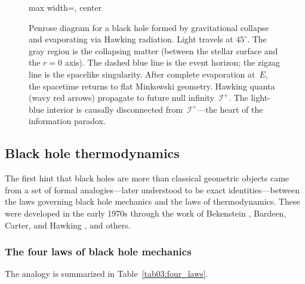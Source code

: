 \documentclass[11pt,letterpaper]{article}
\theoremstyle{plain}
\theoremstyle{definition}
\theoremstyle{remark}
\begin{document}
\begin{figure}[ht]
\begin{adjustbox}{max width=\textwidth, center}
\end{adjustbox}
\caption{Penrose diagram for a black hole formed by gravitational
collapse and evaporating via Hawking radiation.  Light travels at
$45^{\circ}$.  The gray region is the collapsing matter (between the
stellar surface and the $r\!=\!0$ axis).  The dashed blue line is the
event horizon; the zigzag line is the spacelike singularity.  After
complete evaporation at~$E$, the spacetime returns to flat Minkowski
geometry.  Hawking quanta (wavy red arrows) propagate to future null
infinity~$\mathscr{I}^{+}$.  The light-blue interior is causally
disconnected from~$\mathscr{I}^{+}$---the heart of the information
paradox.}
\label{fig03:penrose}
\end{figure}

\subsection{Black hole thermodynamics}\label{subsec03:thermodynamics}

The first hint that black holes are more than classical geometric objects
came from a set of formal analogies---later understood to be exact
identities---between the laws governing black hole mechanics and the laws of
thermodynamics.  These were developed in the early 1970s through the work of
Bekenstein \cite{bekenstein1973}, Bardeen, Carter, and Hawking
\cite{bardeenetal1973}, and others.

\subsubsection*{The four laws of black hole mechanics}

The analogy is summarized in Table~\ref{tab03:four_laws}.
\end{document}
